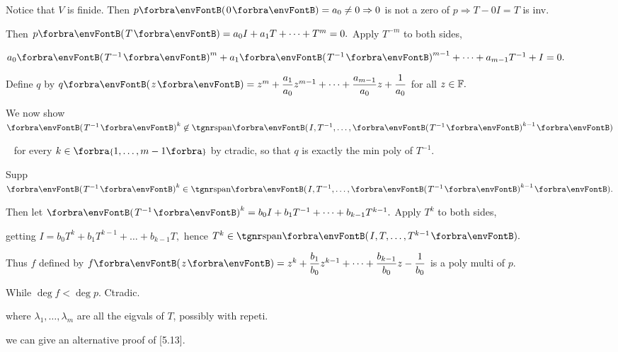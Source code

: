 \par\quad
Notice that $V$ is finide. Then $p\Par{0}=a_0\neq 0\Rightarrow 0$ is not a zero of $p\Rightarrow T-0I=T$ is inv.\par\quad
Then $p\Par{T}=a_0 I+a_1 T+\dots+T^m=0.$ Apply $T^{-m}$ to both sides,\par\quad
$a_0\Par{T^{-1}}^m+a_1\Par{T^{-1}}^{m-1}+\dots+a_{m-1}T^{-1}+I=0.$\par\quad
Define $q$ by $q\Par{z}=z^m+\Frac{a_1}{a_0} z^{m-1}+\dots+\Frac{a_{m-1}}{a_0}z+\Frac{1}{a_0}$ for all $z\in{\mathbb{F}}.$\par\vspace{6pt}\quad
We now show $\Par{T^{-1}}^k\not\in\Span{I,T^{-1},\dots,\Par{T^{-1}}^{k-1}}$\par\qquad\qquad\qquad\,\,\,
for every $k\in\Bra{1,\dots,m-1}$ by ctradic, so that $q$ is exactly the min poly of $T^{-1}.$\par\quad
Supp $\Par{T^{-1}}^k\in\Span{I,T^{-1},\dots,\Par{T^{-1}}^{k-1}}.$\par\quad
Then let $\Par{T^{-1}}^k=b_0 I+b_1 T^{-1}+\dots+b_{k-1}T^{k-1}.$ Apply $T^k$ to both sides,\par\qquad\qquad
 getting $I=b_0 T^k+b_1 T^{k-1}+\dots+b_{k-1}T,$ hence $T^k\in\Span{I,T,\dots,T^{k-1}}.$\par\vspace{6pt}\quad
Thus $f$ defined by $f\Par{z}=z^k+\Frac{b_1}{b_0} z^{k-1}+\dots+\Frac{b_{k-1}}{b_0} z-\Frac{1}{b_0}$ is a poly multi of $p$.\par\quad
While $\deg f<\deg p.$ Ctradic.\PfEnd
\SepLine

\BulletPointX\NoteForSmall{[8.49]}\TextB{}
{\tgsl\large where $\lambda_1,\dots,\lambda_m$ are all the eigvals of $T$, {\tgsc possibly with repeti}.}\par
\BulletPointX\Comment\TextB{}
we can {\tgsc give an alternative proof of [5.13]}.
\SepLine

